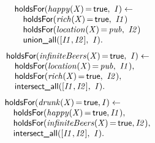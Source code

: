 \documentclass[8pt]{beamer}
\DeclareMathOperator{\val}{=}  %
\def \patsize {}
\def\holdsFor{\textsf{\patsize holdsFor}}
\def\unionall{\textsf{\patsize union\_all}}
\def\intersectall{\textsf{\patsize intersect\_all}}
\def\true{\textsf{\patsize true}}
\newenvironment{mysplit}%
  {\arraycolsep 0pt \begin{array}{l}}%
  {\end{array}}
\begin{document}
\begin{frame}
\begin{minipage}{0.48\linewidth}
        \begin{align*}
            \begin{mysplit}
                \holdsFor\mathit{(happy(X)\val\true,\ I) \leftarrow}\\
                \quad    \holdsFor\mathit{(rich(X)\val\true,\ I1)}\\
                \quad    \holdsFor\mathit{(location(X)\val pub,\ I2)}\\
                \quad    \unionall\mathit{([I1,I2],\ I)}.
            \end{mysplit}
        \end{align*}
        \begin{align*}
            \begin{mysplit}
                \holdsFor\mathit{(infiniteBeers(X)\val\true,\ I) \leftarrow}\\
                \quad    \holdsFor\mathit{(location(X)\val pub,\ I1),}\\
                \quad    \holdsFor\mathit{(rich(X)\val\true,\ I2),}\\
                \quad    \intersectall\mathit{([I1,I2],\ I).}\\
            \end{mysplit}
        \end{align*}
        \begin{align*}
            \begin{mysplit}
                \holdsFor\mathit{(drunk(X)\val\true,I) \leftarrow}\\
                \quad    \holdsFor\mathit{(happy(X)\val\true,I1),}\\
                \quad    \holdsFor\mathit{(infiniteBeers(X)\val\true,I2),}\\
                \quad    \intersectall\mathit{([I1,I2],\ I).}\\
            \end{mysplit}
        \end{align*}
    \end{minipage}

\end{frame}
\end{document}
